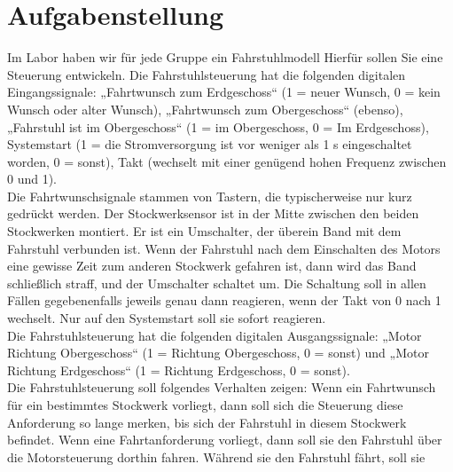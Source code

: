 \documentclass[a4paper,12pt,bibtotocnumbered]{scrartcl} %
\numberwithin{equation}{section} %
\begin{document}
\tableofcontents

\clearpage %

\renewcommand{\thepage}{\arabic{page}}
\setcounter{page}{1}

\section{Aufgabenstellung}
Im Labor haben wir für jede Gruppe ein Fahrstuhlmodell
Hierfür sollen Sie eine Steuerung entwickeln.
Die Fahrstuhlsteuerung hat die folgenden digitalen Eingangssignale:
„Fahrtwunsch zum Erdgeschoss“ (1 = neuer Wunsch, 0 = kein Wunsch
oder alter Wunsch), „Fahrtwunsch zum Obergeschoss“ (ebenso), „Fahrstuhl ist im Obergeschoss“ (1 = im Obergeschoss, 0 = Im Erdgeschoss),
Systemstart (1 = die Stromversorgung ist vor weniger als 1 s eingeschaltet worden, 0 = sonst), Takt (wechselt mit einer genügend hohen Frequenz zwischen 0 und 1).
\\
Die Fahrtwunschsignale stammen von Tastern, die typischerweise nur kurz gedrückt werden.
Der Stockwerksensor ist in der Mitte zwischen den beiden Stockwerken montiert.
Er ist ein Umschalter, der überein Band mit dem Fahrstuhl verbunden ist.
Wenn der Fahrstuhl nach dem Einschalten des Motors eine gewisse Zeit zum anderen Stockwerk
gefahren ist, dann wird das Band schließlich straff, und der Umschalter
schaltet um.
Die Schaltung soll in allen Fällen gegebenenfalls jeweils genau dann reagieren, wenn der Takt von
0 nach 1 wechselt. Nur auf den Systemstart soll sie sofort reagieren.
\\
Die Fahrstuhlsteuerung hat die folgenden digitalen Ausgangssignale: „Motor Richtung Obergeschoss“ (1 = Richtung Obergeschoss, 0 = sonst) und „Motor Richtung Erdgeschoss“ (1 = Richtung Erdgeschoss, 0 = sonst).
\\
Die Fahrstuhlsteuerung soll folgendes Verhalten zeigen: Wenn ein Fahrtwunsch für ein bestimmtes
Stockwerk vorliegt, dann soll sich die Steuerung diese Anforderung so lange merken, bis sich
der Fahrstuhl in diesem Stockwerk befindet. Wenn eine Fahrtanforderung vorliegt, dann soll sie
den Fahrstuhl über die Motorsteuerung dorthin fahren. Während sie den Fahrstuhl fährt, soll sie
\end{document}
